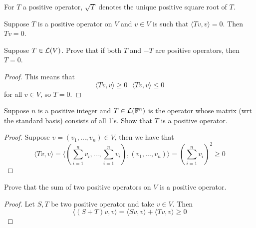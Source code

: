 \documentclass{extarticle}
\begin{document}
\begin{remark}
    For \(T\) a positive operator, \(\sqrt{T}\) denotes the unique positive square root of \(T\).
\end{remark}


\begin{corollary}
    Suppose \(T\) is a positive operator on \(V\) and \(v \in V\) is such that \(\langle Tv,v \rangle = 0\). 
    Then \(Tv = 0\).
\end{corollary}









\newpage 
{}

\begin{problem}{1}
    Suppose \(T \in \mathcal{L}(V)\). Prove that if both \(T\) and \(-T\) are positive operators, then 
    \(T = 0\).
\end{problem}

\begin{proof}
This means that 
\[\langle Tv,v \rangle \geq 0 \ \ \ \langle Tv,v \rangle \leq 0\]
for all \(v \in V\), so \(T = 0\).
\end{proof}

\begin{problem}{3}
    Suppose \(n\) is a positive integer and \(T \in \mathcal{L}(\mathbb{F}^n)\) is the operator whose matrix (wrt 
    the standard basis) consists of all 1's. Show that \(T\) is a positive operator.
\end{problem}

\begin{proof}
Suppose \(v = (v_1, \ldots, v_n) \in V\), then we have that 
\[\langle Tv,v \rangle 
= \langle (\sum_{i=1}^{n} v_i, \ldots, \sum_{i=1}^{n} v_i), (v_1, \ldots, v_n) \rangle
= (\sum_{i=1}^{n} v_i)^2 \geq 0\]
\end{proof}

\begin{problem}{6}
    Prove that the sum of two positive operators on \(V\) is a positive operator.
\end{problem}

\begin{proof}
Let \(S, T\) be two positive operator and take \(v \in V\). Then 
\[\langle (S+T)v,v \rangle = \langle Sv,v \rangle + \langle Tv,v \rangle \geq 0\]
\end{proof}
\end{document}

